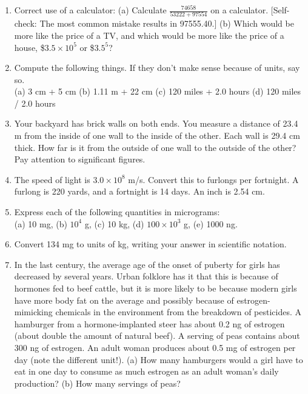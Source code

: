 \divider

\vspace{2mm}

\startexercises\label{sec1dot12}

\begin{enumerate}
\item  Correct use of a calculator: (a) Calculate $\frac{74658}{53222+97554}$ on a calculator.
[Self-check: The most common mistake results in 97555.40.] 
(b) Which would be more like the price of a TV, and which
would be more like the price of a house, \$$3.5\times10^5$  or \$$3.5^5$?


\item Compute the following things. If they don't make sense
because of units, say so.\\
(a) 3 cm + 5 cm 
(b) 1.11 m + 22 cm 
(c) 120 miles + 2.0 hours 
(d) 120 miles / 2.0 hours 


\item  Your backyard has brick walls on both ends. You measure a
distance of 23.4 m from the inside of one wall to the
inside of the other. Each wall is 29.4 cm thick. How far is
it from the outside of one wall to the outside of the other?
Pay attention to significant figures.


\item 
 The speed of light is $3.0\times10^8$  m/s. Convert
this to furlongs per fortnight.  A furlong is 220 yards, and
a fortnight is 14 days.  An inch is 2.54 cm.

\item
 Express each of the following quantities in micrograms:\\
(a) 10 mg, (b) $10^4$ g, (c) 10 kg, (d) $100 \times 10^3$ g, (e) 1000 ng.


\item Convert 134 mg to units of kg, writing your answer in
scientific notation.

\item 
 In the last century, the average age of the onset of
puberty for girls has decreased by several years. Urban
folklore has it that this is because of hormones fed to beef
cattle, but it is more likely to be because modern girls
have more body fat on the average and possibly because of
estrogen-mimicking chemicals in the environment from the
breakdown of pesticides. A hamburger from a hormone-implanted
steer has about 0.2 ng of estrogen (about double the amount
of natural beef). A serving of peas contains about 300 ng of
estrogen. An adult woman produces about 0.5 mg of estrogen
per day (note the different unit!). (a) How many hamburgers
would a girl have to eat in one day to consume as much
estrogen as an adult woman's daily production? (b) How
many servings of peas? 


\end{enumerate}
